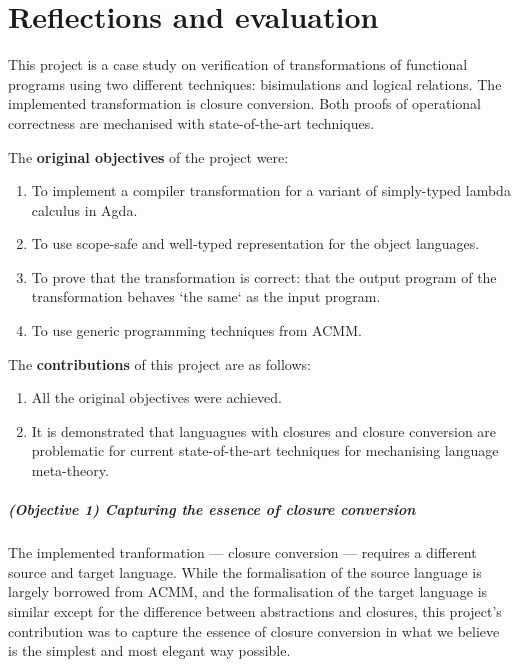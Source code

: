 \documentclass[bsc,frontabs,oneside,singlespacing,parskip,deptreport]{infthesis}
\theoremstyle{definition}
\begin{document}
\chapter{Reflections and evaluation}

This project is a case study on verification of transformations of
functional programs using two different techniques: bisimulations and
logical relations. The implemented transformation is closure
conversion. Both proofs of operational correctness are mechanised with
state-of-the-art techniques.

The \textbf{original objectives} of the project were:

\begin{enumerate}
\item To implement a compiler transformation for a variant of
  simply-typed lambda calculus in Agda.
\item To use scope-safe and well-typed representation for the object
  languages.
\item To prove that the transformation is correct: that the output
  program of the transformation behaves `the same` as the input
  program.
\item To use generic programming techniques from ACMM.
\end{enumerate}

The \textbf{contributions} of this project are as follows:

\begin{enumerate}
\item All the original objectives were achieved.
\item It is demonstrated that languagues with closures and closure
  conversion are problematic for current state-of-the-art techniques
  for mechanising language meta-theory.
\end{enumerate}

\paragraph{(Objective 1) Capturing the essence of closure conversion}
The implemented tranformation --- closure conversion --- requires a
different source and target language. While the formalisation of the
source language is largely borrowed from ACMM, and the formalisation
of the target language is similar except for the difference between
abstractions and closures, this project's contribution was to capture
the essence of closure conversion in what we believe is the simplest
and most elegant way possible.
\end{document}
